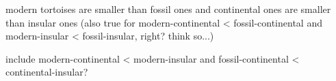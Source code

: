\begin{center}
	\begin{figure}[H]
		\label{fig:boxFMCI}
	\end{figure}
\end{center}


modern tortoises are smaller than fossil ones and continental ones are smaller than insular ones
(also true for modern-continental < fossil-continental and modern-insular < fossil-insular, right? think so...)

include modern-continental < modern-insular and fossil-continental < continental-insular?



